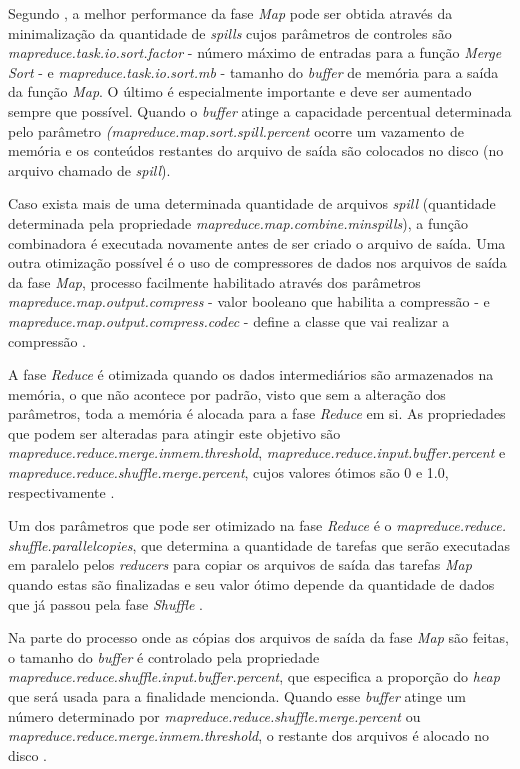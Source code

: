 Segundo \textcite{HadoopBook15}, a melhor performance da fase \textit{Map} pode ser obtida através da minimalização da quantidade de \textit{spills} cujos parâmetros de controles são \textit{mapreduce.task.io.sort.factor} - número máximo de entradas para a função \textit{Merge Sort} - e \textit{mapreduce.task.io.sort.mb} - tamanho do \textit{buffer} de memória para a saída da função \textit{Map}. O último é especialmente importante e deve ser aumentado sempre que possível. Quando o \textit{buffer} atinge a capacidade percentual determinada pelo parâmetro \textit{(mapreduce.map.sort.spill.percent} ocorre um vazamento de memória e os conteúdos restantes do arquivo de saída são colocados no disco (no arquivo chamado de \textit{spill}).

Caso exista mais de uma determinada quantidade de arquivos \textit{spill} (quantidade determinada pela propriedade \textit{mapreduce.map.combine.minspills}), a função combinadora é executada novamente antes de ser criado o arquivo de saída. Uma outra otimização possível é o uso de compressores de dados nos arquivos de saída da fase \textit{Map}, processo facilmente habilitado através dos parâmetros \textit{mapreduce.map.output.compress} - valor booleano que habilita a compressão - e \textit{mapreduce.map.output.compress.codec} - define a classe que vai realizar a compressão \cite{HadoopBook15}.

A fase \textit{Reduce} é otimizada quando os dados intermediários são armazenados na memória, o que não acontece por padrão, visto que sem a alteração dos parâmetros, toda a memória é alocada para a fase \textit{Reduce} em si. As propriedades que podem ser alteradas para atingir este objetivo são \textit{mapreduce.reduce.merge.inmem.threshold}, \textit{mapreduce.reduce.input.buffer.percent} e \textit{mapreduce.reduce.shuffle.merge.percent}, cujos valores ótimos são 0 e 1.0, respectivamente \cite{HadoopBook15}.

Um dos parâmetros que pode ser otimizado na fase \textit{Reduce} é o \textit{mapreduce.reduce. shuffle.parallelcopies}, que determina a quantidade de tarefas que serão executadas em paralelo pelos \textit{reducers} para copiar os arquivos de saída das tarefas \textit{Map} quando estas são finalizadas e seu valor ótimo depende da quantidade de dados que já passou pela fase \textit{Shuffle} \cite{MRONLINELi14}.

Na parte do processo onde as cópias dos arquivos de saída da fase \textit{Map} são feitas, o tamanho do \textit{buffer} é controlado pela propriedade \textit{mapreduce.reduce.shuffle.input.buffer.percent}, que especifica a proporção do \textit{heap} que será usada para a finalidade mencionda. Quando esse \textit{buffer} atinge um número determinado por \textit{mapreduce.reduce.shuffle.merge.percent} ou \textit{mapreduce.reduce.merge.inmem.threshold}, o restante dos arquivos é alocado no disco \cite{HadoopBook15}.

